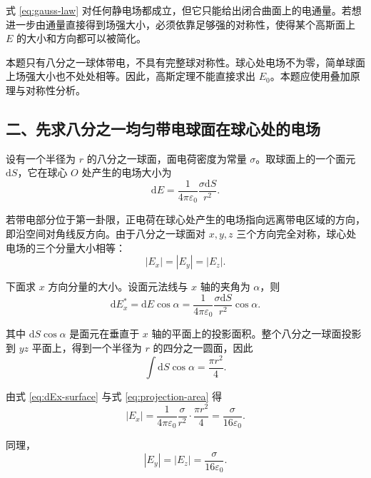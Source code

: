 \documentclass[11pt,a4paper,fontset=fandol]{ctexart}
\newcommand{\dd}{\mathrm{d}}
\newcommand{\eps}{\varepsilon_0}
\begin{document}
式 \eqref{eq:gauss-law} 对任何静电场都成立，但它只能给出闭合曲面上的电通量。若想进一步由通量直接得到场强大小，必须依靠足够强的对称性，使得某个高斯面上 $E$ 的大小和方向都可以被简化。

本题只有八分之一球体带电，不具有完整球对称性。球心处电场不为零，简单球面上场强大小也不处处相等。因此，高斯定理不能直接求出 $E_0$。本题应使用叠加原理与对称性分析。

\subsection*{二、先求八分之一均匀带电球面在球心处的电场}
设有一个半径为 $r$ 的八分之一球面，面电荷密度为常量 $\sigma$。取球面上的一个面元 $\dd S$，它在球心 $O$ 处产生的电场大小为
\begin{equation}
 \dd E=\frac{1}{4\pi\eps}\frac{\sigma\dd S}{r^2}.
 \label{eq:dE-surface}
\end{equation}

若带电部分位于第一卦限，正电荷在球心处产生的电场指向远离带电区域的方向，即沿空间对角线反方向。由于八分之一球面对 $x,y,z$ 三个方向完全对称，球心处电场的三个分量大小相等：
\begin{equation}
 |E_x|=|E_y|=|E_z|.
 \label{eq:component-equal}
\end{equation}

下面求 $x$ 方向分量的大小。设面元法线与 $x$ 轴的夹角为 $\alpha$，则
\begin{equation}
 \dd E_x^{\ast}=\dd E\cos\alpha
 =\frac{1}{4\pi\eps}\frac{\sigma\dd S}{r^2}\cos\alpha.
 \label{eq:dEx-surface}
\end{equation}

其中 $\dd S\cos\alpha$ 是面元在垂直于 $x$ 轴的平面上的投影面积。整个八分之一球面投影到 $yz$ 平面上，得到一个半径为 $r$ 的四分之一圆面，因此
\begin{equation}
 \int \dd S\cos\alpha=\frac{\pi r^2}{4}.
 \label{eq:projection-area}
\end{equation}

由式 \eqref{eq:dEx-surface} 与式 \eqref{eq:projection-area} 得
\begin{equation}
 |E_x|=\frac{1}{4\pi\eps}\frac{\sigma}{r^2}\cdot\frac{\pi r^2}{4}
 =\frac{\sigma}{16\eps}.
 \label{eq:Ex-surface}
\end{equation}

同理，
\begin{equation}
 |E_y|=|E_z|=\frac{\sigma}{16\eps}.
 \label{eq:EyEz-surface}
\end{equation}
\end{document}
